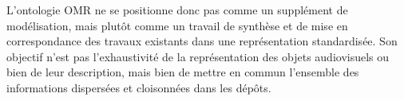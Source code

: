 L'ontologie OMR ne se positionne donc pas comme un supplément de modélisation, mais plutôt comme un travail de synthèse et de mise en correspondance des travaux existants dans une représentation standardisée.
Son objectif n'est pas l'exhaustivité de la représentation des objets audiovisuels ou bien de leur description, mais bien de mettre en commun l'ensemble des informations dispersées et cloisonnées dans les dépôts.














